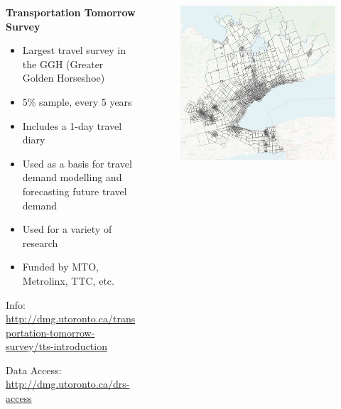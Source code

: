 \documentclass[aspectratio=169]{beamer}
\begin{document}
\begin{frame}
	
		\begin{columns}
		\begin{column}{0.5\textwidth}
			\textbf{Transportation Tomorrow Survey}
			\begin{itemize}
				\item Largest travel survey in the GGH (Greater Golden Horseshoe)
				\item 5\% sample, every 5 years
				\item Includes a 1-day travel diary
				\item Used as a basis for travel demand modelling and forecasting future travel demand
				\item Used for a variety of research
				\item Funded by MTO, Metrolinx, TTC, etc.
			\end{itemize}
		
		\tiny Info: \url{http://dmg.utoronto.ca/transportation-tomorrow-survey/tts-introduction}
		
		\vspace{2mm}
		
		\tiny Data Access: \url{http://dmg.utoronto.ca/drs-access}
			
		\end{column}
		
		\begin{column}{0.5\textwidth}
			
			\begin{figure}
				\centering
				\includegraphics[width=1\linewidth]{images/tts_region.png}
			\end{figure}
			
			
		\end{column}
		
	\end{columns}
	
\end{frame}
\end{document}
